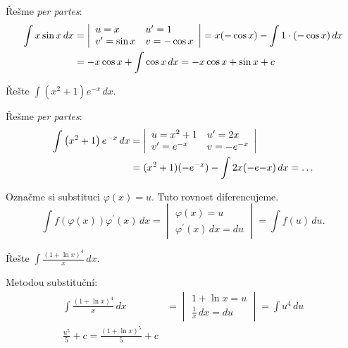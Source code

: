 \begin{reseni}
Řešme \textit{per partes}:
\begin{align*}
\int x \sin x \, dx &=\left |\begin{array}{l l}
    u=x & u^\prime= 1\\
    v^\prime = \sin x & v=-\cos x
\end{array} \right | = x(-\cos x)-\int 1\cdot(-\cos x)\, dx \\
&= -x\cos x+\int \cos x \, dx=-x \cos x +\sin x+c
\end{align*}
\end{reseni}

\begin{priklad}
Řešte $\int (x^2+1)e^{-x}\, dx.$
\end{priklad}

\begin{reseni}
Řešme \textit{per partes}:
\begin{align*}
    \int \left ( x^2+1 \right )e^{-x}\, dx &= \left |\begin{array}{l l}
        u=x^2+1 & u^\prime= 2x\\
        v^\prime = e^{-x} & v=-e^{-x}
    \end{array} \right | \\
    &= (x^2+1)(-e^{-x})-\int 2x(-e{-x})\, dx = \dots
\end{align*}
\end{reseni}

\begin{pozn}
    Označme si substituci $\varphi(x)=u.$ Tuto rovnost diferencujeme.
    $$\int f(\varphi(x))\varphi^\prime(x)\, dx=\begin{vmatrix}
        \varphi(x)=u \\
        \varphi^\prime(x) \, dx=du
    \end{vmatrix}=\int f(u)\, du.$$
\end{pozn}

\begin{priklad}
Řešte $\int \frac{(1+\ln x)^4}{x}\, dx.$
\end{priklad}

\begin{reseni}
Metodou substituční:
\begin{align*}
    \int \frac{(1+\ln x)^4}{x}\, dx &= \begin{vmatrix}
        1+\ln x=u \\
        \frac{1}{x}\, dx=du
    \end{vmatrix}=\int u^4\, du \\
    \frac{u^5}{5}+c=\frac{(1+\ln x)^5}{5}+c
\end{align*}
\end{reseni}

